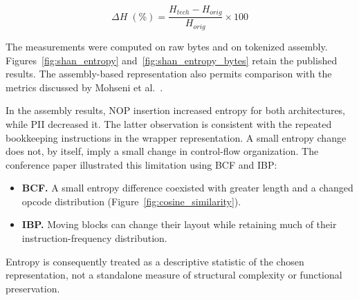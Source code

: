 \documentclass[runningheads]{llncs}
\begin{document}
\begin{equation}
\Delta H \; (\%) = \frac{H_{tech} - H_{orig}}{H_{orig}} \times 100
\end{equation}

The measurements were computed on raw bytes and on tokenized assembly. Figures~\ref{fig:shan_entropy} and~\ref{fig:shan_entropy_bytes} retain the published results. The assembly-based representation also permits comparison with the metrics discussed by Mohseni et al.~\cite{llmobf}.

In the assembly results, NOP insertion increased entropy for both architectures, while PII decreased it. The latter observation is consistent with the repeated bookkeeping instructions in the wrapper representation. A small entropy change does not, by itself, imply a small change in control-flow organization. The conference paper illustrated this limitation using BCF and IBP:

\begin{itemize}
\item \textbf{BCF.} A small entropy difference coexisted with greater length and a changed opcode distribution (Figure~\ref{fig:cosine_similarity}).
    \item \textbf{IBP.} Moving blocks can change their layout while retaining much of their instruction-frequency distribution.

\end{itemize}

Entropy is consequently treated as a descriptive statistic of the chosen representation, not a standalone measure of structural complexity or functional preservation.
\end{document}
